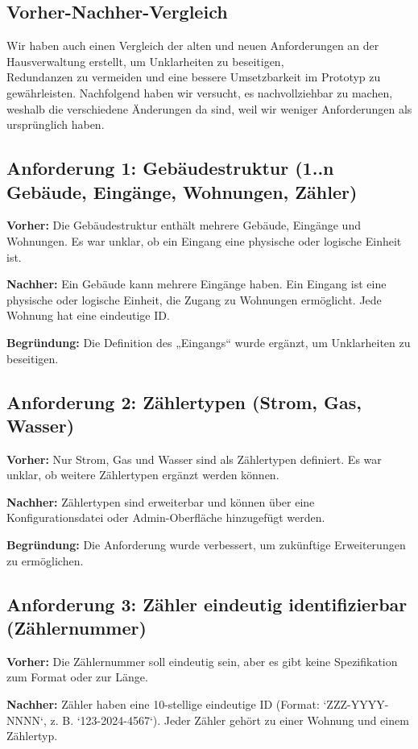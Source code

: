 \subsection{Vorher-Nachher-Vergleich}

Wir haben auch einen Vergleich der alten und neuen Anforderungen an der Hausverwaltung erstellt, um Unklarheiten zu beseitigen, \\
Redundanzen zu vermeiden und eine bessere Umsetzbarkeit im Prototyp zu gewährleisten. Nachfolgend haben wir versucht, es nachvollziehbar zu machen, weshalb die verschiedene Änderungen da sind, weil wir weniger Anforderungen als ursprünglich haben.


\newcommand{\anforderungVergleich}[4]{%
    \subsection*{Anforderung #1: #2}
    \textbf{Vorher:} #3
    
    \vspace{0.3cm}
    \textbf{Nachher:} #4

    \vspace{0.3cm}
}

\anforderungVergleich{1}{Gebäudestruktur (1..n Gebäude, Eingänge, Wohnungen, Zähler)}
{Die Gebäudestruktur enthält mehrere Gebäude, Eingänge und Wohnungen. Es war unklar, ob ein Eingang eine physische oder logische Einheit ist.}
{Ein Gebäude kann mehrere Eingänge haben. Ein Eingang ist eine physische oder logische Einheit, die Zugang zu Wohnungen ermöglicht. Jede Wohnung hat eine eindeutige ID.}

\textbf{Begründung:}  
Die Definition des „Eingangs“ wurde ergänzt, um Unklarheiten zu beseitigen.

\anforderungVergleich{2}{Zählertypen (Strom, Gas, Wasser)}
{Nur Strom, Gas und Wasser sind als Zählertypen definiert. Es war unklar, ob weitere Zählertypen ergänzt werden können.}
{Zählertypen sind erweiterbar und können über eine Konfigurationsdatei oder Admin-Oberfläche hinzugefügt werden.}

\textbf{Begründung:}  
Die Anforderung wurde verbessert, um zukünftige Erweiterungen zu ermöglichen.

\anforderungVergleich{3}{Zähler eindeutig identifizierbar (Zählernummer)}
{Die Zählernummer soll eindeutig sein, aber es gibt keine Spezifikation zum Format oder zur Länge.}
{Zähler haben eine 10-stellige eindeutige ID (Format: `ZZZ-YYYY-NNNN`, z. B. `123-2024-4567`). Jeder Zähler gehört zu einer Wohnung und einem Zählertyp.}

